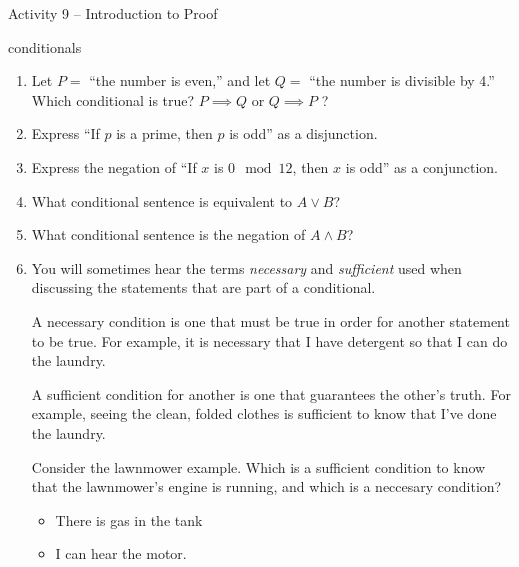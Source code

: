 \documentclass{amsart}
\begin{document}
\thispagestyle{empty}

\centerline{\Large Activity 9 -- Introduction to Proof}
\centerline{\large conditionals}

\bigskip
\Large


\begin{enumerate}

\item Let $P = $ ``the number is even,'' and let $Q =$ ``the number is divisible by 4.''  Which conditional is true?  $P \implies Q$ or $Q \implies P$ ?  

\vfill

\item Express ``If $p$ is a prime, then $p$ is odd'' as a disjunction.

\vfill

\item Express the negation of ``If $x$ is $0 \mod 12$, then $x$ is odd'' as a conjunction.

\vfill

\item What conditional sentence is equivalent to $A \lor B$?

\vfill

\item What conditional sentence is the negation of $A \land B$?

\vfill

\newpage

\item You will sometimes hear the terms {\em necessary} and {\em sufficient} used when discussing the statements that are part of a conditional.  

A necessary condition is one that must be true in order for another statement to be true.  For example, it is necessary that I have detergent so that I can do the laundry.

A sufficient condition for another is one that guarantees the other's truth.  For example, seeing the clean, folded clothes is sufficient to know that I've done the laundry.

Consider the lawnmower example.  Which is a sufficient condition to know that the lawnmower's engine is running, and which is a neccesary condition?

\begin{itemize}
\item There is gas in the tank
\item I can hear the motor.
\end{itemize}


\end{enumerate}
\end{document}
